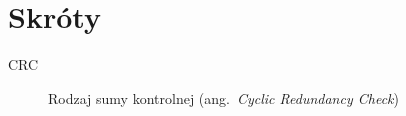 \chapter*{Skróty}\mbox{}
\label{sec:skroty}
\noindent
\begin{description}
  \item [CRC] Rodzaj sumy kontrolnej (ang.\ \emph{Cyclic Redundancy Check})
  
\end{description}
